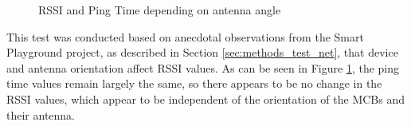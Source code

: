 \begin{figure}[H]
\begin{subfigure}{0.45\textwidth}
    \end{subfigure}
    \vspace{\ftspace}
    \caption{RSSI and Ping Time depending on antenna angle}
    \label{fig:antennaangle}
\end{figure}

This test was conducted based on anecdotal observations from the Smart Playground project, as described in Section \ref{sec:methods_test_net}, that device and antenna orientation affect RSSI values. As can be seen in Figure \ref{fig:antennaangle}, the ping time values remain largely the same, so there appears to be no change in the RSSI values, which appear to be independent of the orientation of the MCBs and their antenna.

